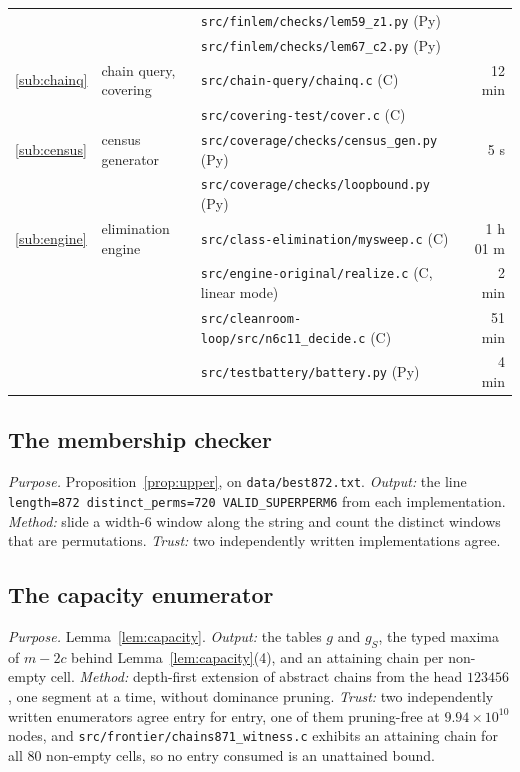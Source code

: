 \documentclass[10pt]{article}
\theoremstyle{remark}
\theoremstyle{plain}
\newcommand{\prog}[1]{\texttt{#1}}
\begin{document}
\begin{table}[H]
\begin{tabular}{@{}lllr@{}}
 & & \prog{src/\allowbreak finlem/\allowbreak checks/\allowbreak lem59\_z1.py} (Py) & \\
 & & \prog{src/\allowbreak finlem/\allowbreak checks/\allowbreak lem67\_c2.py} (Py) & \\
\ref{sub:chainq} & chain query, covering & \prog{src/\allowbreak chain-query/\allowbreak chainq.c} (C) & 12 min\\
 & & \prog{src/\allowbreak covering-test/\allowbreak cover.c} (C) & \\
\ref{sub:census} & census generator & \prog{src/\allowbreak coverage/\allowbreak checks/\allowbreak census\_gen.py} (Py) & 5 s\\
 & & \prog{src/\allowbreak coverage/\allowbreak checks/\allowbreak loopbound.py} (Py) & \\
\ref{sub:engine} & elimination engine & \prog{src/\allowbreak class-elimination/\allowbreak mysweep.c} (C) & 1 h 01 m\\
 & & \prog{src/\allowbreak engine-original/\allowbreak realize.c} (C, linear mode) & 2 min\\
 & & \prog{src/\allowbreak cleanroom-loop/\allowbreak src/\allowbreak n6c11\_decide.c} (C) & 51 min\\
 & & \prog{src/\allowbreak testbattery/\allowbreak battery.py} (Py) & 4 min\\
\bottomrule
\end{tabular}
\end{table}

\subsection{The membership checker}\label{sub:checker}

\emph{Purpose.}  Proposition~\ref{prop:upper}, on
\prog{data/\allowbreak best872.txt}.  \emph{Output:} the line
\prog{length=872 distinct\_perms=720 VALID\_SUPERPERM6} from each
implementation.  \emph{Method:} slide a
width-$6$ window along the string and count the distinct windows that
are permutations.  \emph{Trust:} two independently written implementations agree.

\subsection{The capacity enumerator}\label{sub:frontier}

\emph{Purpose.}  Lemma~\ref{lem:capacity}.  \emph{Output:} the tables $g$ and $g_S$, the typed maxima of $m-2c$
behind Lemma~\ref{lem:capacity}(4), and an attaining chain per
non-empty cell.
\emph{Method:} depth-first extension of abstract chains from the head
$123456$, one segment at a time, without dominance pruning.  \emph{Trust:} two independently written enumerators agree entry for
entry, one of them pruning-free at $9.94\times10^{10}$ nodes, and
\prog{src/\allowbreak frontier/\allowbreak chains871\_witness.c}
exhibits an attaining chain for all $80$ non-empty cells, so no entry
consumed is an unattained bound.
\end{document}
